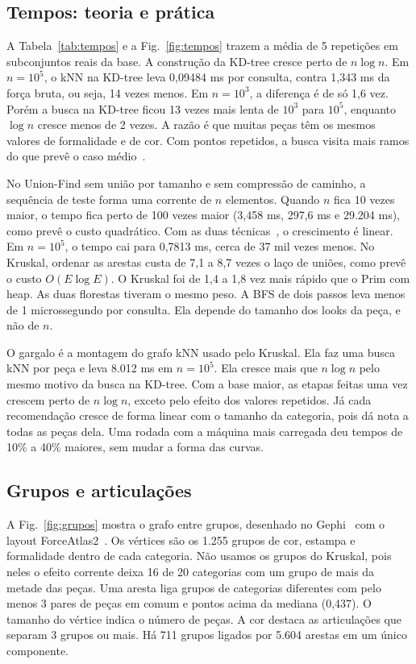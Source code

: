 \subsection{Tempos: teoria e prática}

A Tabela~\ref{tab:tempos} e a Fig.~\ref{fig:tempos} trazem a média de 5 repetições em subconjuntos reais da base. A construção da KD-tree cresce perto de $n \log n$. Em $n = 10^5$, o kNN na KD-tree leva 0,09484 ms por consulta, contra 1,343 ms da força bruta, ou seja, 14 vezes menos. Em $n = 10^3$, a diferença é de só 1,6 vez. Porém a busca na KD-tree ficou 13 vezes mais lenta de $10^3$ para $10^5$, enquanto $\log n$ cresce menos de 2 vezes. A razão é que muitas peças têm os mesmos valores de formalidade e de cor. Com pontos repetidos, a busca visita mais ramos do que prevê o caso médio~\cite{friedman1977}.

No Union-Find sem união por tamanho e sem compressão de caminho, a sequência de teste forma uma corrente de $n$ elementos. Quando $n$ fica 10 vezes maior, o tempo fica perto de 100 vezes maior (3,458 ms, 297,6 ms e 29.204 ms), como prevê o custo quadrático. Com as duas técnicas~\cite{galler1964,tarjan1975}, o crescimento é linear. Em $n = 10^5$, o tempo cai para 0,7813 ms, cerca de 37 mil vezes menos. No Kruskal, ordenar as arestas custa de 7,1 a 8,7 vezes o laço de uniões, como prevê o custo $O(E \log E)$. O Kruskal foi de 1,4 a 1,8 vez mais rápido que o Prim com heap. As duas florestas tiveram o mesmo peso. A BFS de dois passos leva menos de 1 microssegundo por consulta. Ela depende do tamanho dos looks da peça, e não de $n$.

O gargalo é a montagem do grafo kNN usado pelo Kruskal. Ela faz uma busca kNN por peça e leva 8.012 ms em $n = 10^5$. Ela cresce mais que $n \log n$ pelo mesmo motivo da busca na KD-tree. Com a base maior, as etapas feitas uma vez crescem perto de $n \log n$, exceto pelo efeito dos valores repetidos. Já cada recomendação cresce de forma linear com o tamanho da categoria, pois dá nota a todas as peças dela. Uma rodada com a máquina mais carregada deu tempos de 10\% a 40\% maiores, sem mudar a forma das curvas.

\subsection{Grupos e articulações}

A Fig.~\ref{fig:grupos} mostra o grafo entre grupos, desenhado no Gephi~\cite{bastian2009} com o layout ForceAtlas2~\cite{jacomy2014}. Os vértices são os 1.255 grupos de cor, estampa e formalidade dentro de cada categoria. Não usamos os grupos do Kruskal, pois neles o efeito corrente deixa 16 de 20 categorias com um grupo de mais da metade das peças. Uma aresta liga grupos de categorias diferentes com pelo menos 3 pares de peças em comum e pontos acima da mediana (0,437). O tamanho do vértice indica o número de peças. A cor destaca as articulações que separam 3 grupos ou mais. Há 711 grupos ligados por 5.604 arestas em um único componente.

